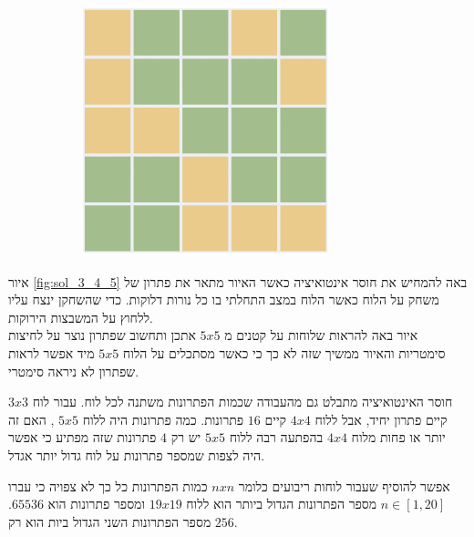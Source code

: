 \documentclass[12pt,twoside]{article}
\begin{document}
\begin{figure}[h]
\begin{subfigure}[b]{.25\linewidth}
    \end{subfigure}
    \begin{subfigure}[b]{.25\linewidth}
    \includegraphics[width=\linewidth]{images/5x5_sol.PNG}
    \end{subfigure}

\end{figure}
\sethebrew

איור
\ref{fig:sol_3_4_5}
באה להמחיש את חוסר  אינטואיציה
כאשר האיור מתאר את פתרון של משחק על הלוח כאשר הלוח במצב התחלתי בו כל נורות דלוקות.
כדי שהשחקן ינצח עליו ללחוץ על המשבצות הירוקות.
\\
איור באה להראות שלוחות על קטנים מ
$5x5$
אתכן ותחשוב שפתרון נוצר על לחיצות סימטריות והאיור ממשיך שזה לא כך 
כי כאשר מסתכלים על הלוח 
$5x5$
מיד אפשר לראות שפתרון לא ניראה סימטרי.

חוסר האינטואיציה מתבלט גם מהעבודה שכמות הפתרונות משתנה לכל לוח.
עבור לוח 
$3x3$
קיים פתרון יחיד,
אבל ללוח 
$4x4$
קיים
$16$
פתרונות.
כמה פתרונות היה ללוח
$5x5$
,
האם זה יותר או פחות מלוח
$4x4$
בהפתעה רבה ללוח 
$5x5$
יש רק 
$4$
פתרונות שזה  מפתיע כי אפשר היה לצפות שמספר פתרונות על לוח גדול יותר אגדל.

אפשר להוסיף שעבור לוחות ריבועים כלומר
$n x n$
כמות הפתרונות כל כך לא צפויה כי עברו 
$n \in [1,20]$
מספר הפתרונות הגדול ביותר הוא ללוח
$19x19$
ומספר פתרונות 
הוא 
$65536$.
מספר הפתרונות השני הגדול ביות הוא רק
$256$.
\end{document}
